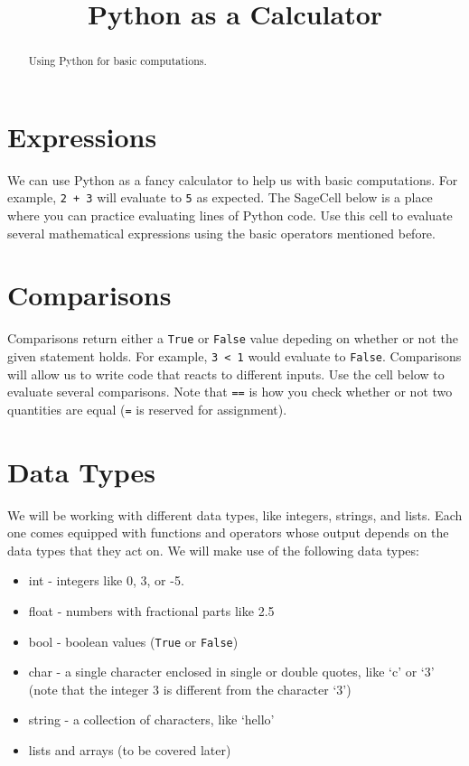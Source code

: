 \documentclass{ximera}
\title{Python as a Calculator}
\begin{document}
  
\begin{abstract}  
Using Python for basic computations.
\end{abstract}  
\maketitle

\section{Expressions}

We can use Python as a fancy calculator to help us with basic computations. For example, \verb|2 + 3| will evaluate to \verb|5| as expected. The SageCell below is a place where you can practice evaluating lines of Python code. Use this cell to evaluate several mathematical expressions using the basic operators mentioned before.


\section{Comparisons}

Comparisons return either a \verb|True| or \verb|False| value depeding on whether or not the given statement holds. For example, \verb|3 < 1| would evaluate to \verb|False|. Comparisons will allow us to write code that reacts to different inputs. Use the cell below to evaluate several comparisons. Note that \verb|==| is how you check whether or not two quantities are equal (\verb|=| is reserved for assignment).

\section{Data Types}

We will be working with different data types, like integers, strings, and lists. Each one comes equipped with functions and operators whose output depends on the data types that they act on. We will make use of the following data types:

\begin{itemize}
	\item int - integers like 0, 3, or -5.
	\item float - numbers with fractional parts like 2.5
	\item bool - boolean values (\verb|True| or \verb|False|)
	\item char - a single character enclosed in single or double quotes, like `c' or `3' (note that the integer 3 is different from the character `3')
	\item string - a collection of characters, like `hello'
	\item lists and arrays (to be covered later)
\end{itemize}

\begin{sageCell}

\end{sageCell}
\end{document}
